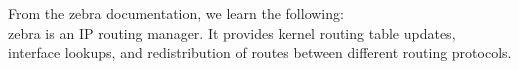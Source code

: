 From the zebra documentation, we learn the following: \\
zebra is an IP routing manager. It provides kernel routing table updates, interface lookups, and redistribution of routes between different routing protocols.
